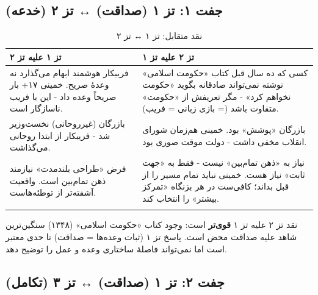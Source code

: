 \documentclass[12pt,a4paper]{book}
\newcommand{\keyword}[1]{\textbf{\textcolor{cPrimary}{#1}}}
\begin{document}
\subsection{جفت ۱: تز ۱ (صداقت) ↔ تز ۲ (خدعه)}

\begin{longtable}{%
    >{\raggedleft\arraybackslash}p{}
    >{\raggedleft\arraybackslash}p{}}
\toprule
\rowcolor{cGreen!10}
\textbf{تز ۱ علیه تز ۲} &
\rowcolor{cAccent!8}
\textbf{تز ۲ علیه تز ۱} \\
\midrule

فریبکار هوشمند ابهام می‌گذارد نه وعدهٔ صریح. خمینی ۱۷+ بار صریحاً وعده داد - این با فریب ناسازگار است. &
کسی که ده سال قبل کتاب «حکومت اسلامی» نوشته نمی‌تواند صادقانه بگوید «حکومت نخواهم کرد» - مگر تعریفش از «حکومت» متفاوت باشد (= بازی زبانی = فریب). \\
\midrule

بازرگان (غیرروحانی) نخست‌وزیر شد - فریبکار از ابتدا روحانی می‌گذاشت. &
بازرگان «پوشش» بود. خمینی هم‌زمان شورای انقلاب مخفی داشت - دولت موقت صوری بود. \\
\midrule

فرض «طراحی بلندمدت» نیازمند ذهن تمام‌بین است. واقعیت آشفته‌تر از توطئه‌هاست. &
نیاز به «ذهن تمام‌بین» نیست - فقط به «جهت ثابت» نیاز هست. خمینی نباید تمام مسیر را از قبل بداند؛ کافی‌ست در هر بزنگاه «تمرکز بیشتر» را انتخاب کند. \\

\bottomrule
\caption{نقد متقابل: تز ۱ ↔ تز ۲}
\end{longtable}

\begin{noteBox}
نقد تز ۲ علیه تز ۱ \keyword{قوی‌تر} است: وجود کتاب «حکومت اسلامی» (۱۳۴۸) سنگین‌ترین شاهد علیه صداقت محض است. پاسخ تز ۱ (ثبات وعده‌ها = صداقت) تا حدی معتبر است اما نمی‌تواند فاصلهٔ ساختاری وعده و عمل را توضیح دهد.
\end{noteBox}

\subsection{جفت ۲: تز ۱ (صداقت) ↔ تز ۳ (تکامل)}
\end{document}
